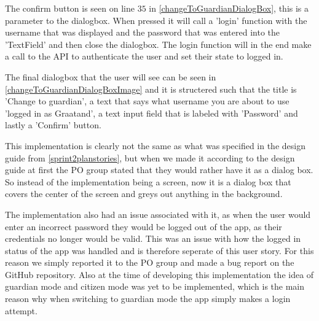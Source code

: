 The confirm button is seen on line $35$ in \autoref{changeToGuardianDialogBox}, this is a parameter to the dialogbox.
When pressed it will call a 'login' function with the username that was displayed and the password that was entered into the 'TextField' and then close the dialogbox.
The login function will in the end make a call to the API to authenticate the user and set their state to logged in.

The final dialogbox that the user will see can be seen in \autoref{changeToGuardianDialogBoxImage} and it is structered such that the title is 'Change to guardian', a text that says what username you are about to use 'logged in as Graatand', a text input field that is labeled with 'Password' and lastly a 'Confirm' button.



This implementation is clearly not the same as what was specified in the design guide from \autoref{sprint2planstories}, but when we made it according to the design guide at first the PO group stated that they would rather have it as a dialog box.
So instead of the implementation being a screen, now it is a dialog box that covers the center of the screen and greys out anything in the background.

The implementation also had an issue associated with it, as when the user would enter an incorrect password they would be logged out of the app, as their credentials no longer would be valid.
This was an issue with how the logged in status of the app was handled and is therefore seperate of this user story.
For this reason we simply reported it to the PO group and made a bug report on the GitHub repository.
Also at the time of developing this implementation the idea of guardian mode and citizen mode was yet to be implemented, which is the main reason why when switching to guardian mode the app simply makes a login attempt.

